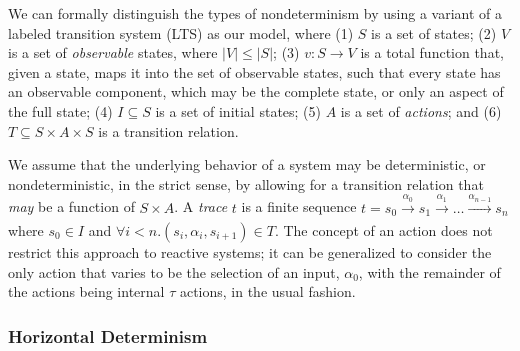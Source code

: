 We can formally distinguish the types of nondeterminism by using a
variant of a labeled transition system (LTS) as our model, where (1) $S$
is a set of states; (2) $V$ is a set of \emph{observable} states, where
$|V| \leq |S|$; (3) $v: S \rightarrow V$ is a total function that, given a state, maps it
  into the set of observable states, such that every state has an observable
  component, which may be the complete state, or only an aspect of the
  full state; (4)  $I \subseteq S$ is a set of initial states; (5) $A$
  is a set of \emph{actions}; and (6) $T \subseteq S \times A \times S$ is a transition relation.

We assume that the underlying behavior of a system may be
deterministic, or nondeterministic, in the strict sense, by allowing
for a transition relation that \emph{may} be a function of
$S \times A$.  A \emph{trace} $t$ is a finite sequence $t = s_0
\xrightarrow[]{\alpha_0} s_1 \xrightarrow[]{\alpha_1} \ldots
\xrightarrow[]{\alpha_{n-1}} s_n$ where $s_0 \in I$ and $\forall i < n
. (s_i, \alpha_i, s_{i+1}) \in T$.  The concept of an action does not restrict this approach to reactive
systems; it can be generalized to consider the only action that varies
to be the selection of an input, $\alpha_0$, with the remainder of the
actions being internal $\tau$ actions, in the usual fashion.

\subsubsection{Horizontal Determinism}

